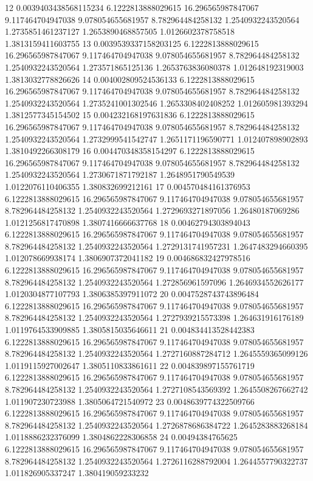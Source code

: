 {12 0.0039403438568115234 6.1222813888029615 16.296565987847067 9.117464704947038 9.078054655681957 8.782964484258132 1.2540932243520564 1.2735851461237127 1.2653890468857505 1.0126602378758518 1.3813159411603755
13 0.0039539337158203125 6.1222813888029615 16.296565987847067 9.117464704947038 9.078054655681957 8.782964484258132 1.2540932243520564 1.273571865125136 1.2653763836080378 1.012648192319003 1.3813032778826626
14 0.004002809524536133 6.1222813888029615 16.296565987847067 9.117464704947038 9.078054655681957 8.782964484258132 1.2540932243520564 1.2735241001302546 1.2653308402408252 1.012605981393294 1.3812577345154502
15 0.004232168197631836 6.1222813888029615 16.296565987847067 9.117464704947038 9.078054655681957 8.782964484258132 1.2540932243520564 1.2732999541542747 1.2651171196590771 1.012407898902893 1.3810492266308179
16 0.004470348358154297 6.1222813888029615 16.296565987847067 9.117464704947038 9.078054655681957 8.782964484258132 1.2540932243520564 1.2730671871792187 1.2648951790549539 1.0122076110406355 1.380832699212161
17 0.004570484161376953 6.1222813888029615 16.296565987847067 9.117464704947038 9.078054655681957 8.782964484258132 1.2540932243520564 1.2729693271897056 1.26480187069286 1.0121256817470898 1.3807416666637768
18 0.00462794303894043 6.1222813888029615 16.296565987847067 9.117464704947038 9.078054655681957 8.782964484258132 1.2540932243520564 1.2729131741957231 1.2647483294660395 1.012078669938174 1.3806907372041182
19 0.004686832427978516 6.1222813888029615 16.296565987847067 9.117464704947038 9.078054655681957 8.782964484258132 1.2540932243520564 1.272856961597096 1.2646934552626177 1.0120304877107793 1.3806385397911072
20 0.0047528743743896484 6.1222813888029615 16.296565987847067 9.117464704947038 9.078054655681957 8.782964484258132 1.2540932243520564 1.2727939215573398 1.264631916176189 1.0119764533909885 1.3805815035646611
21 0.004834413528442383 6.1222813888029615 16.296565987847067 9.117464704947038 9.078054655681957 8.782964484258132 1.2540932243520564 1.2727160887284712 1.2645559365099126 1.0119115927002647 1.3805110833861611
22 0.004839897155761719 6.1222813888029615 16.296565987847067 9.117464704947038 9.078054655681957 8.782964484258132 1.2540932243520564 1.2727108543569392 1.2645508267662742 1.011907230723988 1.3805064721540972
23 0.0048639774322509766 6.1222813888029615 16.296565987847067 9.117464704947038 9.078054655681957 8.782964484258132 1.2540932243520564 1.2726878686384722 1.2645283883268184 1.0118886232376099 1.3804862228306858
24 0.00494384765625 6.1222813888029615 16.296565987847067 9.117464704947038 9.078054655681957 8.782964484258132 1.2540932243520564 1.2726116288792004 1.2644557790322737 1.011826905337247 1.380419059233232
}
